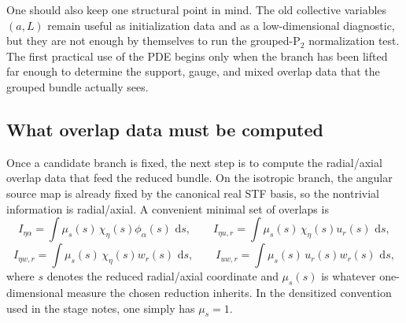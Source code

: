 \documentclass[11pt]{article}
\theoremstyle{definition}
\newcommand{\dd}{\,\mathrm{d}}
\newcommand{\Ptwo}{\ensuremath{\mathrm{P}_2}}
\begin{document}
One should also keep one structural point in mind. The old collective variables $(a,L)$ remain useful as initialization data and as a low-dimensional diagnostic, but they are not enough by themselves to run the grouped-$\Ptwo$ normalization test. The first practical use of the PDE begins only when the branch has been lifted far enough to determine the support, gauge, and mixed overlap data that the grouped bundle actually sees.

\subsection{What overlap data must be computed}

Once a candidate branch is fixed, the next step is to compute the radial/axial overlap data that feed the reduced bundle. On the isotropic branch, the angular source map is already fixed by the canonical real STF basis, so the nontrivial information is radial/axial. A convenient minimal set of overlaps is
\begin{equation}
 I_{\eta\alpha}=
 \int \mu_s(s)\,\chi_\eta(s)\phi_\alpha(s)\,\dd s,
 \qquad
 I_{\eta u,r}=
 \int \mu_s(s)\,\chi_\eta(s)u_r(s)\,\dd s,
 \label{eq:howto-overlap-set-a}
\end{equation}
\begin{equation}
 I_{\eta w,r}=
 \int \mu_s(s)\,\chi_\eta(s)w_r(s)\,\dd s,
 \qquad
 I_{uw,r}=
 \int \mu_s(s)\,u_r(s)w_r(s)\,\dd s,
 \label{eq:howto-overlap-set-b}
\end{equation}
where $s$ denotes the reduced radial/axial coordinate and $\mu_s(s)$ is whatever one-dimensional measure the chosen reduction inherits. In the densitized convention used in the stage notes, one simply has $\mu_s=1$.
\end{document}
